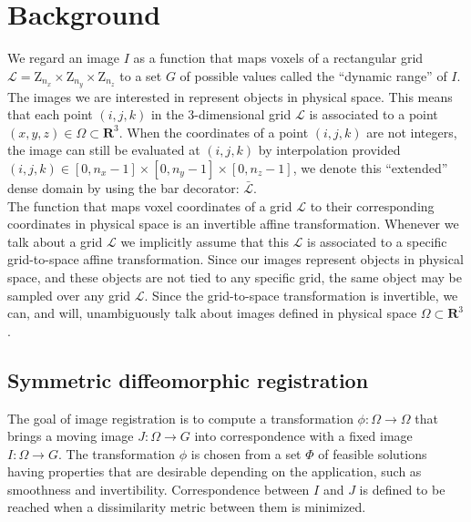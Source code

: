 \section{Background}

We regard an image $I$ as a function that maps voxels of a rectangular grid \hbox{$\mathcal{L} = \mathrm{Z}_{n_{x}} \times \mathrm{Z}_{n_{y}} \times \mathrm{Z}_{n_{z}}$} to a set $G$ of
possible values called the ``dynamic range'' of $I$. The images we are interested in represent objects in physical space. This means that each point $(i,j,k)$ in the
3-dimensional grid $\mathcal{L}$ is associated to a point $(x,y,z) \in \Omega \subset \mathbf{R}^{3}$. When the coordinates of a point
\hbox{$(i,j,k)$} are not integers, the image can still be evaluated at $(i, j, k)$ by interpolation provided
\hbox{$(i,j,k) \in \left[0, n_{x}-1\right] \times \left[0, n_{y}-1\right] \times \left[0, n_{z}-1\right]$}, we denote this ``extended'' dense domain by using the bar decorator:
$\bar{\mathcal{L}}$.\\

The function that maps voxel coordinates of a grid $\mathcal{L}$ to their corresponding coordinates in physical space is an invertible affine transformation. Whenever we talk about
a grid $\mathcal{L}$ we implicitly assume that this $\mathcal{L}$ is associated to a specific grid-to-space affine transformation.
Since our images represent objects in physical space, and these objects are not tied to any specific grid, the same object may be sampled over any grid $\mathcal{L}$. Since
the grid-to-space transformation is invertible, we can, and will, unambiguously talk about images defined in physical space $\Omega \subset \mathbf{R}^{3}$.\\

\subsection{Symmetric diffeomorphic registration}

The goal of image registration is to compute a transformation $\phi: \Omega \rightarrow \Omega$ that brings a moving image $J:\Omega \rightarrow G$ into correspondence
with a fixed image $I:\Omega \rightarrow G$. The transformation $\phi$ is chosen from a set $\Phi$ of feasible solutions having properties that are desirable depending on the
application, such as smoothness and invertibility. Correspondence between $I$ and $J$ is defined to be reached when a dissimilarity metric between them is minimized.\\

